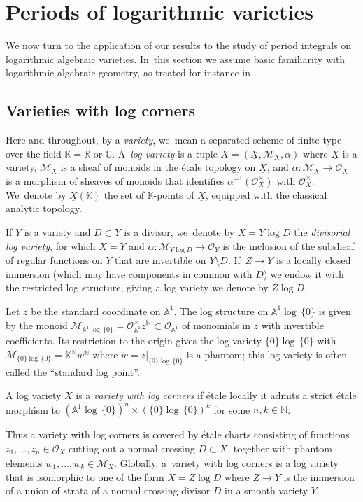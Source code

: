 \documentclass[10pt]{amsart}
\theoremstyle{definition}
\theoremstyle{remark}
\newenvironment{example}
  {\pushQED{\qed}\renewcommand{\qedsymbol}{$\lozenge$}\examplex}
  {\popQED\endexamplex}
\let\defn\emph
\newcommand{\CC}{\mathbb{C}}
\newcommand{\KK}{\mathbb{K}}
\newcommand{\RR}{\mathbb{R}}
\newcommand{\NN}{\mathbb{N}}
\newcommand{\AF}{\mathbb{A}}
\newcommand{\logcyl}{\AF^1 \log\, \{0\}}
\newcommand{\logcirc}{\{0\} \log\, \{0\}}
\newcommand{\cO}[1]{\mathcal{O}_{#1}}
\newcommand{\cOx}[1]{\cO{#1}^\times}
\newcommand{\cM}{\mathscr{M}}
\newcommand{\uX}{\underline{X}}
\newcommand{\uD}{\underline{D}}
\begin{document}
\section{Periods of logarithmic varieties}
\label{sec:periods}
We now turn to the application of our results to the study of period integrals on logarithmic algebraic varieties. In~this section we assume basic familiarity with logarithmic algebraic geometry, as treated for instance in \cite{Kato1989a,KatoNakayama,Ogus}.

\subsection{Varieties with log corners} Here and throughout, by a \defn{variety}, we~mean a separated scheme of finite type over the field $\KK =\RR$ or $\CC$. A~\defn{log variety} is a tuple $X = (\uX,\cM_X,\alpha)$ where $\uX$ is a variety, $\cM_X$ is a sheaf of monoids in the étale topology on $\uX$, and $\alpha \colon \cM_X \to \cO{X}$ is a morphism of sheaves of monoids that identifies $\alpha^{-1}(\cOx{X})$ with $\cOx{X}$. We~denote by $\uX(\KK)$ the set of $\KK$-points of $\uX$, equipped with the classical analytic topology.

If $Y$ is a variety and $D \subset Y$ is a divisor, we~denote by $X = Y \log D$ the \defn{divisorial log variety}, for which $\uX =Y$ and $\alpha \colon \cM_{Y \log D} \to \cO{Y}$ is the inclusion of the subsheaf of regular functions on $Y$ that are invertible on $Y \setminus D$. If~$Z \to Y$ is a locally closed immersion (which may have components in common with $D$) we endow it with the restricted log structure, giving a log variety we denote by $Z \log D$.

\begin{example}
Let $z$ be the standard coordinate on $\AF^1$. The log structure on $\logcyl$ is given by the monoid $\cM_{\logcyl}=\cOx{\AF^1} z^\NN \subset \cO{\AF^1}$ of monomials in $z$ with invertible coefficients. Its restriction to the origin gives the log variety $\logcirc$ with $\cM_{\logcirc} = \KK^\times w^\NN$ where $w = z|_{\logcirc}$ is a phantom; this log variety is often called the ``standard log point''.
\end{example}

\begin{definition}
A log variety $X$ is a \defn{variety with log corners} if étale locally it admits a strict étale morphism to $(\logcyl)^n \times (\logcirc)^k$ for some $n,k \in \NN$.
\end{definition}
Thus a variety with log corners is covered by étale charts consisting of functions $z_1,\ldots,z_n \in \cO{\uX}$ cutting out a normal crossing $\uD\subset \uX$, together with phantom elements $w_1,\ldots,w_k \in \cM_X$. Globally, a~variety with log corners is a log variety that is isomorphic to one of the form $X = Z \log D$ where $Z \to Y$ is the immersion of a union of strata of a normal crossing divisor $D$ in a smooth variety $Y$.
\end{document}
